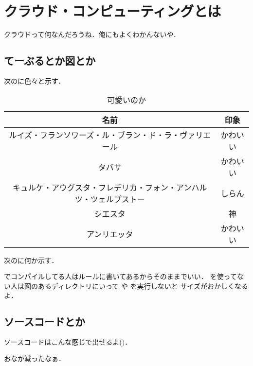
\section{クラウド・コンピューティングとは}
クラウドって何なんだろうね．俺にもよくわかんないや．

\subsection*{てーぶるとか図とか}
次のに色々と示す．

\begin{table}[tbh]
	\caption{可愛いのか} \label{tab:example}
	\begin{center}
		\begin{tabular}[htb]{c|c}
		\hline
		名前 & 印象 \\
		\hline
		ルイズ・フランソワーズ・ル・ブラン・ド・ラ・ヴァリエール & かわいい \\ \hline
		タバサ & かわいい \\ \hline
		キュルケ・アウグスタ・フレデリカ・フォン・アンハルツ・ツェルプストー & しらん \\ \hline
		シエスタ & 神 \\ \hline
		アンリエッタ & かわいい \\ \hline
		\end{tabular}
	\end{center}
\end{table}

次のに何か示す．


でコンパイルしてる人はルールに書いてあるからそのままでいい．
を使ってない人は図のあるディレクトリにいって  や  を実行しないと
サイズがおかしくなるよ．


\ifSRC
	\subsection*{ソースコードとか}
	ソースコードはこんな感じで出せるよ()．

\fi

おなか減ったなぁ．
